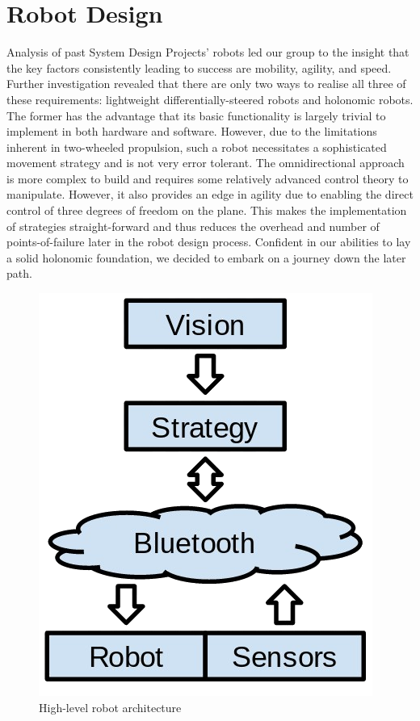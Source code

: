 \documentclass[journal,a4paper,12pt]{IEEEtran}
\begin{document}
\section{Robot Design}\label{s:robot}

Analysis of past System Design Projects' robots led our group to the insight that the key factors consistently leading to success are mobility, agility, and speed. Further investigation revealed that there are only two ways to realise all three of these requirements: lightweight differentially-steered robots and holonomic robots. The former has the advantage that its basic functionality is largely trivial to implement in both hardware and software. However, due to the limitations inherent in two-wheeled propulsion, such a robot necessitates a sophisticated movement strategy and is not very error tolerant. The omnidirectional approach is more complex to build and requires some relatively advanced control theory to manipulate. However, it also provides an edge in agility due to enabling the direct control of three degrees of freedom on the plane. This makes the implementation of strategies straight-forward and thus reduces the overhead and number of points-of-failure later in the robot design process. Confident in our abilities to lay a solid holonomic foundation, we decided to embark on a journey down the later path.

\begin{figure}[!htb]
\centering
  \includegraphics[width=0.5\columnwidth]{architecture.png}
  \caption{High-level robot architecture}
  \label{f:architecture}
\end{figure}
\end{document}
